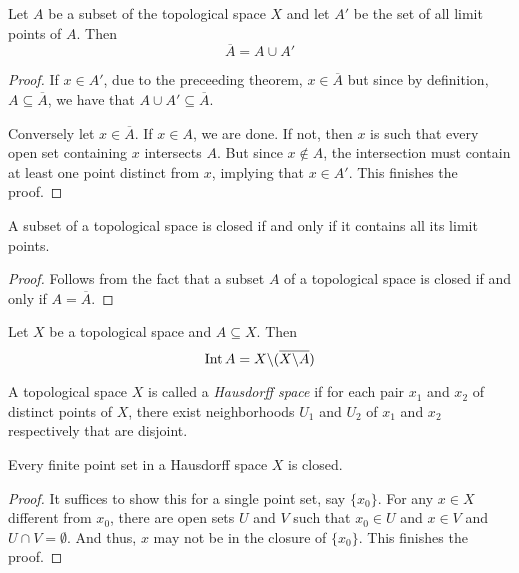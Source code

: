 \begin{theorem}
    Let $A$ be a subset of the topological space $X$ and let $A'$ be the set of all limit points of $A$. Then 
    \begin{equation*}
        \overline{A} = A\cup A'
    \end{equation*}
\end{theorem}
\begin{proof}
    If $x\in A'$, due to the preceeding theorem, $x\in\overline{A}$ but since by definition, $A\subseteq\overline{A}$, we have that $A\cup A'\subseteq\overline{A}$.

    Conversely let $x\in\overline{A}$. If $x\in A$, we are done. If not, then $x$ is such that every open set containing $x$ intersects $A$. But since $x\notin A$, the intersection must contain at least one point distinct from $x$, implying that $x\in A'$. This finishes the proof.
\end{proof}
\begin{corollary}
    A subset of a topological space is closed if and only if it contains all its limit points.
\end{corollary}
\begin{proof}
    Follows from the fact that a subset $A$ of a topological space is closed if and only if $A = \overline{A}$.
\end{proof}

\begin{theorem}
    Let $X$ be a topological space and $A\subseteq X$. Then 
    \begin{equation*}
        \operatorname{Int} A = X\backslash(\overline{X\backslash A})
    \end{equation*}
\end{theorem}

\begin{definition}
    A topological space $X$ is called a \textit{Hausdorff space} if for each pair $x_1$ and $x_2$ of distinct points of $X$, there exist neighborhoods $U_1$ and $U_2$ of $x_1$ and $x_2$ respectively that are disjoint.
\end{definition}

\begin{theorem}
    Every finite point set in a Hausdorff space $X$ is closed.
\end{theorem}
\begin{proof}
    It suffices to show this for a single point set, say $\{x_0\}$. For any $x\in X$ different from $x_0$, there are open sets $U$ and $V$ such that $x_0\in U$ and $x\in V$ and $U\cap V=\emptyset$. And thus, $x$ may not be in the closure of $\{x_0\}$. This finishes the proof.
\end{proof}

